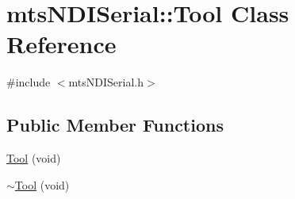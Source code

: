 \hypertarget{classmts_n_d_i_serial_1_1_tool}{\section{mts\-N\-D\-I\-Serial\-:\-:Tool Class Reference}
\label{classmts_n_d_i_serial_1_1_tool}
}


{\ttfamily \#include $<$mts\-N\-D\-I\-Serial.\-h$>$}

\subsection*{Public Member Functions}
\begin{DoxyCompactItemize}
\item 
\hyperlink{classmts_n_d_i_serial_1_1_tool_a39a0ab6a716a320766ed0eb059aba993}{Tool} (void)
\item 
\hyperlink{classmts_n_d_i_serial_1_1_tool_a694fff39bf4ae020486a8ad3e6da9db2}{$\sim$\-Tool} (void)
\end{DoxyCompactItemize}
